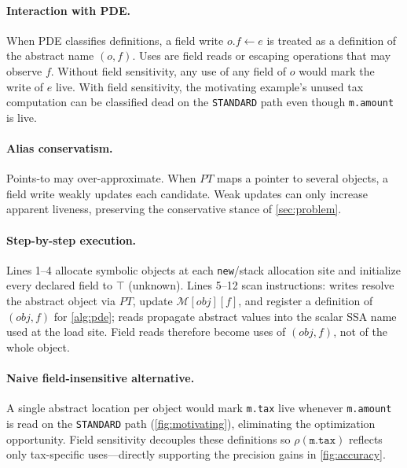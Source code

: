 \documentclass[acmsmall,screen,review,anonymous]{acmart}
\begin{document}
\paragraph{Interaction with PDE.}
When PDE classifies definitions, a field write $o.f\leftarrow e$ is treated as a definition of the abstract name $(o,f)$. Uses are field reads or escaping operations that may observe $f$. Without field sensitivity, any use of any field of $o$ would mark the write of $e$ live. With field sensitivity, the motivating example's unused tax computation can be classified dead on the \texttt{STANDARD} path even though \texttt{m.amount} is live.

\paragraph{Alias conservatism.}
Points-to may over-approximate. When $PT$ maps a pointer to several objects, a field write weakly updates each candidate. Weak updates can only increase apparent liveness, preserving the conservative stance of \autoref{sec:problem}.

\paragraph{Step-by-step execution.}
Lines 1--4 allocate symbolic objects at each \texttt{new}/stack allocation site and initialize every declared field to $\top$ (unknown). Lines 5--12 scan instructions: writes resolve the abstract object via $PT$, update $\mathcal{M}[obj][f]$, and register a definition of $(obj,f)$ for \autoref{alg:pde}; reads propagate abstract values into the scalar SSA name used at the load site. Field reads therefore become uses of $(obj,f)$, not of the whole object.

\paragraph{Naive field-insensitive alternative.}
A single abstract location per object would mark \texttt{m.tax} live whenever \texttt{m.amount} is read on the \texttt{STANDARD} path (\autoref{fig:motivating}), eliminating the optimization opportunity. Field sensitivity decouples these definitions so $\rho(\texttt{m.tax})$ reflects only tax-specific uses---directly supporting the precision gains in \autoref{fig:accuracy}.
\end{document}
